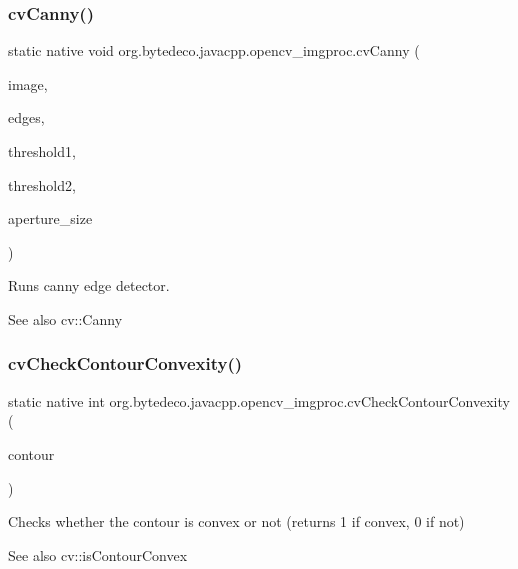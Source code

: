 \subsubsection{\texorpdfstring{cv\+Canny()}{cvCanny()}}
{\footnotesize\ttfamily static native void org.\+bytedeco.\+javacpp.\+opencv\+\_\+imgproc.\+cv\+Canny (\begin{DoxyParamCaption}\item[{@Const Cv\+Arr}]{image,  }\item[{Cv\+Arr}]{edges,  }\item[{double}]{threshold1,  }\item[{double}]{threshold2,  }\item[{int}]{aperture\+\_\+size }\end{DoxyParamCaption})\hspace{0.3cm}{\ttfamily [static]}}



Runs canny edge detector. 

\begin{DoxySeeAlso}{See also}
cv\+::\+Canny 
\end{DoxySeeAlso}
\mbox{\label{group__imgproc__c_ga178a23955341ae86d5a45b1e1c71f7f7}} 
\subsubsection{\texorpdfstring{cv\+Check\+Contour\+Convexity()}{cvCheckContourConvexity()}}
{\footnotesize\ttfamily static native int org.\+bytedeco.\+javacpp.\+opencv\+\_\+imgproc.\+cv\+Check\+Contour\+Convexity (\begin{DoxyParamCaption}\item[{@Const Cv\+Arr}]{contour }\end{DoxyParamCaption})\hspace{0.3cm}{\ttfamily [static]}}



Checks whether the contour is convex or not (returns 1 if convex, 0 if not) 

\begin{DoxySeeAlso}{See also}
cv\+::is\+Contour\+Convex 
\end{DoxySeeAlso}
\mbox{\label{group__imgproc__c_gab8c1b5f5ebf57e5afee16a409d0f4b18}} 
